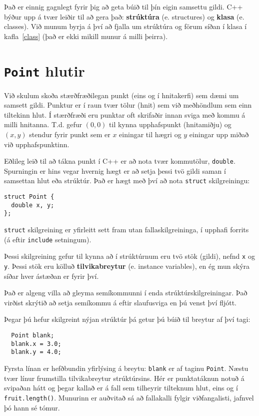 Það er einnig gagnlegt fyrir þig að geta búið til þín eigin samsettu gildi.
C++ býður upp á tvær leiðir til að gera það: {\bf strúktúra} (e. structures) og {\bf klasa} (e. classes).
Við munum byrja á því að fjalla um strúktúra og förum síðan í klasa í kafla~\ref{class} (það er ekki mikill munur á milli þeirra).

\section{{\tt Point} hlutir}

Við skulum skoða stærðfræðilegan punkt (eins og í hnitakerfi) sem dæmi um samsett gildi.
Punktur er í raun tvær tölur (hnit) sem við meðhöndlum sem einn tiltekinn hlut.
Í stærðfræði eru punktar oft skrifaðir innan sviga með kommu á milli hnitanna.
T.d. gefur $(0, 0)$ til kynna upphafspunkt (hnitamiðju) og $(x, y)$ stendur fyrir punkt sem er $x$ einingar til hægri og $y$ einingar upp miðað við upphafspunktinn.

Eðlileg leið til að tákna punkt í C++ er að nota tvær kommutölur, {\tt double}.
Spurningin er hins vegar hvernig hægt er að setja þessi tvö gildi saman í samsettan hlut eða strúktúr.
Það er hægt með því að nota {\tt struct} skilgreiningu:

\begin{verbatim}
struct Point {
  double x, y;
};  
\end{verbatim}
%
{\tt struct} skilgreining er yfirleitt sett fram utan fallaskilgreininga, í upphafi forrits (á eftir {\tt include} setningum).

Þessi skilgreining gefur til kynna að í strúktúrnum eru tvö stök (gildi), nefnd {\tt x} og {\tt y}.
Þessi stök eru kölluð {\bf tilvikabreytur} (e. instance variables), en ég mun skýra síðar hver ástæðan er fyrir því.

Það er algeng villa að gleyma semíkommunni í enda strúktúrskilgreiningar.
Það virðist skrýtið að setja semíkommu á eftir slaufusviga en þú venst því fljótt.

Þegar þú hefur skilgreint nýjan strúktúr þá getur þú búið til breytur af því tagi:

\begin{verbatim}
  Point blank;
  blank.x = 3.0;
  blank.y = 4.0;   
\end{verbatim}
%
Fyrsta línan er hefðbundin yfirlýsing á breytu: {\tt blank} er af taginu {\tt Point}.
Næstu tvær línur frumstilla tilvikabreytur strúktúrsins.
Hér er punktatáknun notuð á svipaðan hátt og þegar kallað er á fall sem tilheyrir tilteknum hlut, eins og í {\tt fruit.length()}.
Munurinn er auðvitað sá að fallakalli fylgir viðfangalisti, jafnvel þó hann sé tómur.

